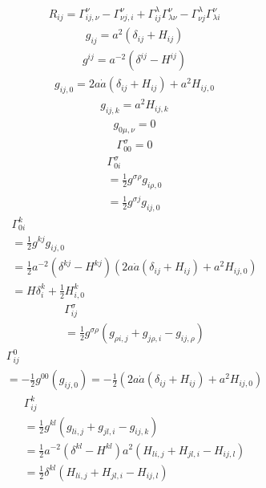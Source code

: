 \documentclass[12pt]{ctexart}
\title{}
\author{}
\theoremstyle{definition}
\begin{document}
\begin{eqnarray}
    R_{ij}
    =\Gamma^{\nu}_{ij,\nu}
    -\Gamma^{\nu}_{\nu j,i}
    +\Gamma^{\lambda}_{ij}\Gamma^{\nu}_{\lambda\nu}
    -\Gamma^{\lambda}_{\nu j}\Gamma^{\nu}_{\lambda i}
\end{eqnarray}
\begin{eqnarray}
    g_{ij}=a^2(\delta_{ij}+H_{ij})
\end{eqnarray}
\begin{eqnarray}
    g^{ij}=a^{-2}(\delta^{ij}-H^{ij})
\end{eqnarray}
\begin{eqnarray}
    g_{ij,0}=2a\dot{a}(\delta_{ij}+H_{ij})+a^2{H}_{ij,0}
\end{eqnarray}
\begin{eqnarray}
    g_{ij,k}=a^2H_{ij,k}
\end{eqnarray}
\begin{eqnarray}
    g_{0\mu,\nu}=0
\end{eqnarray}
\begin{eqnarray}
    \Gamma^{\sigma}_{00}=0
\end{eqnarray}
\begin{eqnarray}
    \Gamma^{\sigma}_{0i}\\
    =\frac{1}{2}g^{\sigma\rho}g_{i\rho,0}\\
    =\frac{1}{2}g^{\sigma j}g_{ij,0}
\end{eqnarray}
\begin{eqnarray}
    \Gamma^{k}_{0i}\\
    =\frac{1}{2}g^{k j}g_{ij,0}\\
    =\frac{1}{2}a^{-2}(\delta^{kj}-H^{kj})
    (2a\dot{a}(\delta_{ij}+H_{ij})+a^2{H}_{ij,0})\\
    =H\delta^k_{i}+\frac{1}{2}H^k_{i,0}
\end{eqnarray}
\begin{eqnarray}
    \Gamma^{\sigma}_{ij}\\
    =\frac{1}{2}g^{\sigma\rho}(g_{\rho i,j}+g_{j \rho,i}-g_{ij,\rho})
\end{eqnarray}
\begin{eqnarray}
    \Gamma^{0}_{ij}\\
    =-\frac{1}{2}g^{00}(g_{ij,0})
    =-\frac{1}{2}(2a\dot{a}(\delta_{ij}+H_{ij})+a^2{H}_{ij,0})
\end{eqnarray}
\begin{eqnarray}
    \Gamma^{k}_{ij}\\
    =\frac{1}{2}g^{kl}(g_{l i,j}+g_{j 
    l,i}-g_{ij,k})\\
    =\frac{1}{2}a^{-2}(\delta^{kl}-H^{kl})a^2(H_{l i,j}+H_{j 
    l,i}-H_{ij,l})\\
    =\frac{1}{2}\delta^{kl}(H_{l i,j}+H_{j 
    l,i}-H_{ij,l})
\end{eqnarray}
\end{document}
